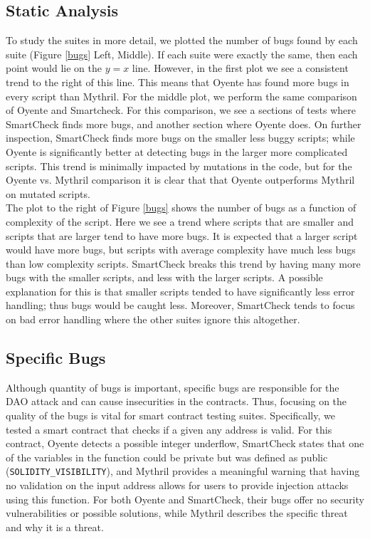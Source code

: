\subsection{Static Analysis}

To study the suites in more detail, we plotted the number of bugs found by each suite (Figure \ref{bugs} Left, Middle). If each suite were exactly the same, then each point would lie on the $y=x$ line. However, in the first plot we see a consistent trend to the right of this line. This means that Oyente has found more bugs in every script than Mythril. For the middle plot, we perform the same comparison of Oyente and Smartcheck. For this comparison, we see a sections of tests where SmartCheck finds more bugs, and another section where Oyente does. On further inspection, SmartCheck finds more bugs on the smaller less buggy scripts; while Oyente is significantly better at detecting bugs in the larger more complicated scripts.  This trend is minimally impacted by mutations in the code, but for the Oyente vs. Mythril comparison it is clear that that Oyente outperforms Mythril on mutated scripts.\\

The plot to the right of Figure \ref{bugs} shows the number of bugs as a function of complexity of the script. Here we see a trend where scripts that are smaller and scripts that are larger tend to have more bugs. It is expected that a larger script would have more bugs, but scripts with average complexity have much less bugs than low complexity scripts.  SmartCheck breaks this trend by having many more bugs with the smaller scripts, and less with the larger scripts. A possible explanation for this is that smaller scripts tended to have significantly less error handling; thus bugs would be caught less. Moreover, SmartCheck tends to focus on bad error handling where the other suites ignore this altogether.  \\

\subsection{Specific Bugs}

Although quantity of bugs is important, specific bugs are responsible for the DAO attack and can cause insecurities in the contracts. Thus, focusing on the quality of the bugs is vital for smart contract testing suites. Specifically, we tested a smart contract that checks if a given any address is valid. For this contract, Oyente detects a possible integer underflow, SmartCheck states that one of the variables in the function could be private but was defined as public (\texttt{SOLIDITY\_VISIBILITY}), and Mythril provides a meaningful warning that having no validation on the input address allows for users to provide injection attacks using this function. For both Oyente and SmartCheck, their bugs offer no security vulnerabilities or possible solutions, while Mythril describes the specific threat and why it is a threat.  

